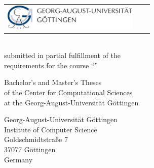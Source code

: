 %
%

\begin{titlepage}
    \normalsize
    \begin{tabularx}{\textwidth}{lXr}
        \multirow{2}{*}{\includegraphics[width=6.5cm]{images/goe-logo.jpg}} 
        & & \\
    \end{tabularx}

    \large
    \centering

    \vspace{3cm}

    \textbf{\LARGE \mytype}\\

    submitted in partial fulfillment of the\\
    requirements for the course ``\mycourse''

    \vspace{2cm}

    \textbf{\LARGE \mytitle}

    \vspace{2cm}

    \myauthor

    \vspace{2cm}

    \mydepartment

    \vspace{2cm}

    Bachelor's and Master's Theses\\
    of the Center for Computational Sciences\\
    at the Georg-August-Universität Göttingen

    \vspace{0.2cm}

    \mysubmissiondate


    \myemptypage
    \clearpage
    \thispagestyle{empty}
    \null
    \flushleft
    \onehalfspacing
    \normalsize

    \vspace{12cm}

    Georg-August-Universität Göttingen\\
    Institute of Computer Science\\[3ex]
    Goldschmidtstraße 7\\
    37077 Göttingen\\
    Germany\\[3ex]


\end{titlepage}
